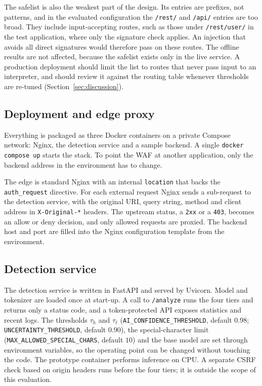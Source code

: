 \documentclass[preprint,11pt]{elsarticle}
\begin{document}
The safelist is also the weakest part of the design. Its entries are
prefixes, not patterns, and in the evaluated configuration the
\texttt{/rest/} and \texttt{/api/} entries are too broad. They include
input-accepting routes, such as those under \texttt{/rest/user/} in the test
application, where only the signature check applies. An injection that
avoids all direct signatures would therefore pass on these routes. The
offline results are not affected, because the safelist exists only in the
live service. A production deployment should limit the list to routes that
never pass input to an interpreter, and should review it against the
routing table whenever thresholds are re-tuned
(Section~\ref{sec:discussion}).

\subsection{Deployment and edge proxy}
\label{sec:impl}
Everything is packaged as three Docker containers on a private Compose
network: Nginx, the detection service and a sample backend. A single
\texttt{docker compose up} starts the stack. To point the WAF at another
application, only the backend address in the environment has to change.

The edge is standard Nginx with an internal \texttt{location} that backs
the \texttt{auth\_request} directive. For each external request Nginx sends
a sub-request to the detection service, with the original URI, query
string, method and client address in \texttt{X-Original-*} headers. The
upstream status, a \texttt{2xx} or a \texttt{403}, becomes an allow or deny
decision, and only allowed requests are proxied. The backend host and port
are filled into the Nginx configuration template from the environment.

\subsection{Detection service}
The detection service is written in FastAPI and served by Uvicorn. Model
and tokenizer are loaded once at start-up. A call to \texttt{/analyze} runs
the four tiers and returns only a status code, and a token-protected API
exposes statistics and recent logs. The thresholds $\tau_h$ and $\tau_\ell$
(\texttt{AI\_CONFIDENCE\_THRESHOLD}, default $0.98$;
\texttt{UNCERTAINTY\_THRESHOLD}, default $0.90$), the special-character
limit (\texttt{MAX\_ALLOWED\_SPECIAL\_CHARS}, default $10$) and the base
model are set through environment variables, so the operating point can be
changed without touching the code. The prototype container performs
inference on CPU. A separate CSRF check based on origin headers runs before
the four tiers; it is outside the scope of this evaluation.
\end{document}
